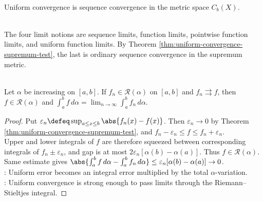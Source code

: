 \begin{perspective} \label{per:supremum-metric-function-space-lens} \\
Uniform convergence is sequence convergence in the metric space $C_b(X)$.
\end{perspective}

\begin{perspective} \label{per:four-limit-notions-function-space-view} \\
The four limit notions are sequence limits, function limits, pointwise function limits, and uniform function limits. By Theorem \ref{thm:uniform-convergence-supremum-test}, the last is ordinary sequence convergence in the supremum metric.
\end{perspective}

\begin{theorem} \label{thm:uniform-convergence-and-riemann-stieltjes-integration} \\
Let $\alpha$ be increasing on $[a,b]$. If $f_n\in\mathcal{R}(\alpha)$ on $[a,b]$ and $f_n\rightrightarrows f$, then $f\in\mathcal{R}(\alpha)$ and $\int_a^b f\,d\alpha=\lim_{n\to\infty}\int_a^b f_n\,d\alpha$.
\begin{proof}
Put $\varepsilon_n\defeq\sup_{a\leq x\leq b}\abs{f_n(x)-f(x)}$. Then $\varepsilon_n\to0$ by Theorem \ref{thm:uniform-convergence-supremum-test}, and $f_n-\varepsilon_n\leq f\leq f_n+\varepsilon_n$.\\
Upper and lower integrals of $f$ are therefore squeezed between corresponding integrals of $f_n\pm\varepsilon_n$, and gap is at most $2\varepsilon_n[\alpha(b)-\alpha(a)]$. Thus $f\in\mathcal{R}(\alpha)$. Same estimate gives $\abs{\int_a^b f\,d\alpha-\int_a^b f_n\,d\alpha}\leq \varepsilon_n[\alpha(b)-\alpha(a)]\to0$.\\
: Uniform error becomes an integral error multiplied by the total $\alpha$-variation.\\
: Uniform convergence is strong enough to pass limits through the Riemann--Stieltjes integral.
\end{proof}
\end{theorem}


